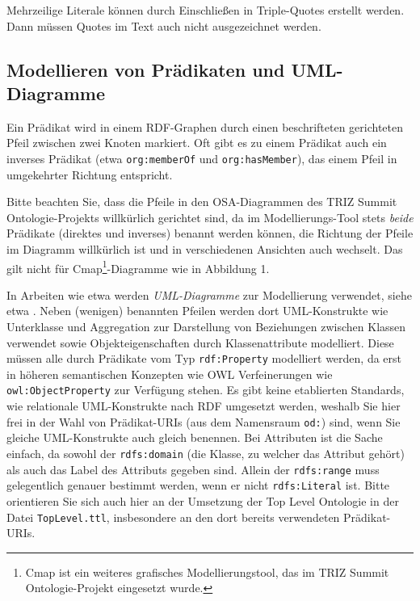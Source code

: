 \documentclass[11pt,a4paper]{article}
\begin{document}
Mehrzeilige Literale können durch Einschließen in Triple-Quotes erstellt
werden. Dann müssen Quotes im Text auch nicht ausgezeichnet werden.

\subsection{Modellieren von Prädikaten und UML-Diagramme}

Ein Prädikat wird in einem RDF-Graphen durch einen beschrifteten gerichteten
Pfeil zwischen zwei Knoten markiert.   Oft gibt es zu einem Prädikat auch ein
inverses Prädikat (etwa \texttt{org:memberOf} und \texttt{org:hasMember}), das
einem Pfeil in umgekehrter Richtung entspricht.

Bitte beachten Sie, dass die Pfeile in den OSA-Diagrammen des TRIZ Summit
Ontologie-Projekts willkürlich gerichtet sind, da im Modellierungs-Tool stets
\emph{beide} Prädikate (direktes und inverses) benannt werden können, die
Richtung der Pfeile im Diagramm willkürlich ist und in verschiedenen Ansichten
auch wechselt.  Das gilt nicht für Cmap\footnote{Cmap ist ein weiteres
  grafisches Modellierungstool, das im TRIZ Summit Ontologie-Projekt
  eingesetzt wurde.}-Diagramme wie in Abbildung 1.

In Arbeiten wie etwa \cite{IDM2011} werden \emph{UML-Diagramme} zur
Modellierung verwendet, siehe etwa \cite[Fig. 2]{IDM2011}. Neben (wenigen)
benannten Pfeilen werden dort UML-Konstrukte wie Unterklasse und Aggregation
zur Darstellung von Beziehungen zwischen Klassen verwendet sowie
Objekteigenschaften durch Klassenattribute modelliert.  Diese müssen alle
durch Prädikate vom Typ \texttt{rdf:Property} \cite{RDFS} modelliert werden,
da erst in höheren semantischen Konzepten wie OWL \cite{OWL} Verfeinerungen
wie \texttt{owl:ObjectProperty} zur Verfügung stehen.  Es gibt keine
etablierten Standards, wie relationale UML-Konstrukte nach RDF umgesetzt
werden, weshalb Sie hier frei in der Wahl von Prädikat-URIs (aus dem
Namensraum \texttt{od:}) sind, wenn Sie gleiche UML-Konstrukte auch gleich
benennen.  Bei Attributen ist die Sache einfach, da sowohl der
\texttt{rdfs:domain} (die Klasse, zu welcher das Attribut gehört) als auch das
Label des Attributs gegeben sind.  Allein der \texttt{rdfs:range} muss
gelegentlich genauer bestimmt werden, wenn er nicht \texttt{rdfs:Literal} ist.
Bitte orientieren Sie sich auch hier an der Umsetzung der Top Level Ontologie
in der Datei \texttt{TopLevel.ttl}, insbesondere an den dort bereits
verwendeten Prädikat-URIs.
\end{document}

